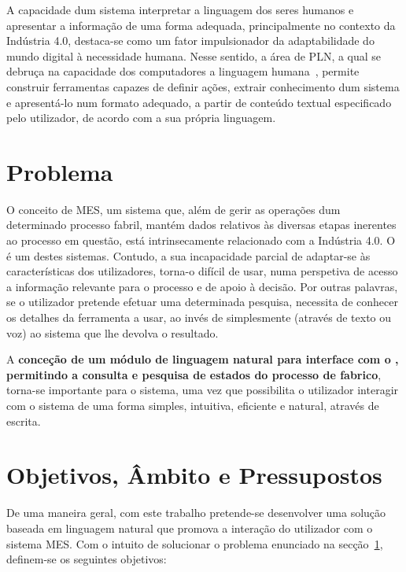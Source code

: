 A capacidade dum sistema interpretar a linguagem dos seres humanos e apresentar a informação de uma forma adequada, principalmente no contexto da Indústria 4.0, destaca-se como um fator impulsionador da adaptabilidade do mundo digital à necessidade humana. Nesse sentido, a área de \gls{PLN}, a qual se debruça na capacidade dos computadores  a linguagem humana~\parencite[p.1]{applied_natural_language_processing_with_python}, permite construir ferramentas capazes de definir ações, extrair conhecimento dum sistema e apresentá-lo num formato adequado, a partir de conteúdo textual especificado pelo utilizador, de acordo com a sua própria linguagem. 

\section{Problema}
\label{sec:chap1_problem}

O conceito de \gls{MES}, um sistema que, além de gerir as operações dum determinado processo fabril, mantém dados relativos às diversas etapas inerentes ao processo em questão, está intrinsecamente relacionado com a Indústria 4.0. O \productname é um destes sistemas. Contudo, a sua incapacidade parcial de adaptar-se às características dos utilizadores, torna-o difícil de usar, numa perspetiva de acesso a informação relevante para o processo e de apoio à decisão. Por outras palavras, se o utilizador pretende efetuar uma determinada pesquisa, necessita de conhecer os detalhes da ferramenta a usar, ao invés de simplesmente  (através de texto ou voz) ao sistema que lhe devolva o resultado.

A \textbf{conceção de um módulo de linguagem natural para interface com o \productname, permitindo a consulta e pesquisa de estados do processo de fabrico}, torna-se importante para o sistema, uma vez que possibilita o utilizador interagir com o sistema de uma forma simples, intuitiva, eficiente e natural, através de escrita.

\section{Objetivos, Âmbito e Pressupostos}
\label{sec:chap1_objectives}
De uma maneira geral, com este trabalho pretende-se desenvolver uma solução baseada em linguagem natural que promova a interação do utilizador com o sistema \gls{MES}. Com o intuito de solucionar o problema enunciado na secção~\ref{sec:chap1_problem}, definem-se os seguintes objetivos:

